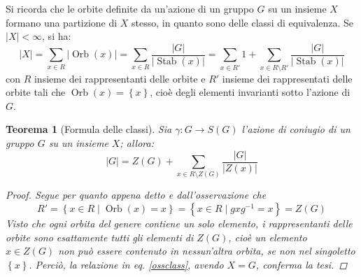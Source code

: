 \documentclass[11pt]{scrartcl}
\theoremstyle{style1}
\newtheorem{teorema}{Teorema}[section]
\numberwithin{equation}{subsection}
\begin{document}
Si ricorda che le orbite definite da un'azione di un gruppo $G$ su un insieme $X$ formano una partizione di $X$ stesso, in quanto sono delle classi di equivalenza.
Se $\lvert X \rvert < \infty$, si ha:
\begin{equation}\label{ossclass}
\lvert X \rvert  = \sum_{x \in R}^{} \lvert \operatorname{Orb} (x) \rvert = \sum_{x \in R}^{} \frac{\lvert G \rvert }{\lvert \operatorname{Stab} (x) \rvert } = \sum_{x \in R'}^{} 1 + \sum_{x \in R \setminus R '}^{} \frac{\lvert G \rvert }{\lvert \operatorname{Stab} (x) \rvert }
\end{equation}
con $R$ insieme dei rappresentanti delle orbite e $R'$ insieme dei rappresentati delle orbite tali che $\operatorname{Orb} (x) = \left\{ x \right\} $, cio\`e degli elementi invarianti sotto l'azione di $G$. 
\begin{teorema}
	[Formula delle classi]
	Sia $\gamma:G \to S(G)$ l'azione di coniugio di un gruppo $G$ su un insieme $X$; allora:
	\begin{equation*}
		\lvert G \rvert  = Z(G) + \sum_{x \in R \setminus Z(G)}^{} \frac{\lvert G \rvert }{\lvert Z(x) \rvert }
	\end{equation*}
	\begin{proof}
		Segue per quanto appena detto e dall'osservazione che
		\[
		R' = \left\{ x \in R  \mid \operatorname{Orb} (x) = x \right\} = \left\{ x \in R  \mid gxg^{-1} = x \right\} = Z(G)
		\] 
		Visto che ogni orbita del genere contiene un solo elemento, i rappresentanti delle orbite sono esattamente tutti gli elementi di $Z(G)$, cio\`e un elemento $x \in Z(G)$ non pu\`o essere contenuto in nessun'altra orbita, se non nel singoletto $\left\{ x \right\} $.
		Perci\`o, la relazione in eq. \ref{ossclass}, avendo $X=G$, conferma la tesi.
	\end{proof}
\end{teorema}
\end{document}
